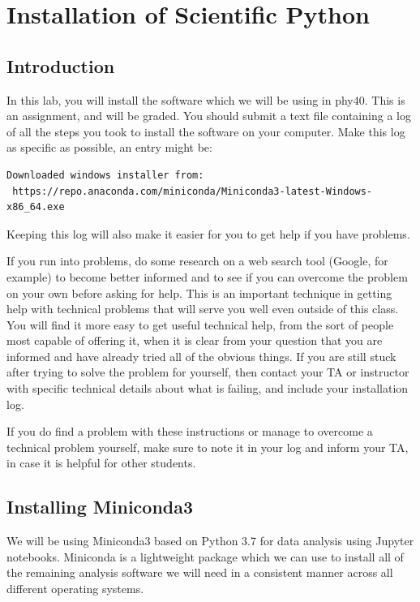\chapter{Installation of Scientific Python}

\section{Introduction}

In this lab, you will install the software which we will be using in
phy40. This is an assignment, and will be graded.  You should submit a
text file containing a log of all the steps you took to install the
software on your computer.  Make this log as specific as possible, an
entry might be:
\begin{verbatim}
Downloaded windows installer from:
 https://repo.anaconda.com/miniconda/Miniconda3-latest-Windows-x86_64.exe
\end{verbatim}  
Keeping this log will also make it easier for you to get help if you
have problems.

If you run into problems, do some research on a web search tool
(Google, for example) to become better informed and to see if you can
overcome the problem on your own before asking for help.  This is an
important technique in getting help with technical problems that will
serve you well even outside of this class.  You will find it more easy
to get useful technical help, from the sort of people most capable of
offering it, when it is clear from your question that you are informed
and have already tried all of the obvious things.  If you are still
stuck after trying to solve the problem for yourself, then contact
your TA or instructor with specific technical details about what is
failing, and include your installation log.

If you do find a problem with these instructions or manage to overcome
a technical problem yourself, make sure to note it in your log and
inform your TA, in case it is helpful for other students.

\section{Installing Miniconda3}

We will be using Miniconda3 based on Python 3.7 for data analysis
using Jupyter notebooks.  Miniconda is a lightweight package which we
can use to install all of the remaining analysis software we will need
in a consistent manner across all different operating systems.

